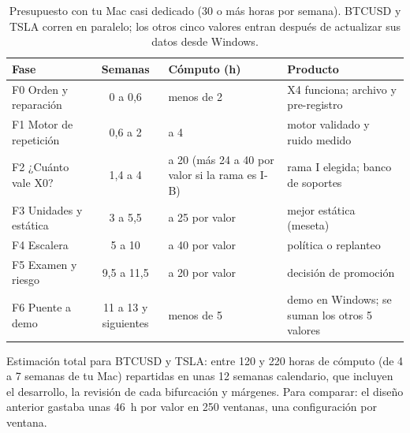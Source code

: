\documentclass[11pt,a4paper]{article}
\begin{document}
\begin{table}[H]
\centering\small
\begin{tabularx}{\linewidth}{lc>{\raggedright\arraybackslash}p{3.9cm}X}
\toprule
Fase & Semanas & Cómputo (h) & Producto \\
\midrule
F0 Orden y reparación & 0 a 0,6 & menos de 2 & X4 funciona; archivo y pre-registro \\
F1 Motor de repetición & 0,6 a 2 & 2 a 4 & motor validado y ruido medido \\
F2 ¿Cuánto vale X0? & 1,4 a 4 & 10 a 20 (más 24 a 40 por valor si la rama es I-B) & rama I elegida; banco de soportes \\
F3 Unidades y estática & 3 a 5,5 & 15 a 25 por valor & mejor estática (meseta) \\
F4 Escalera & 5 a 10 & 10 a 40 por valor & política o replanteo \\
F5 Examen y riesgo & 9,5 a 11,5 & 10 a 20 por valor & decisión de promoción \\
F6 Puente a demo & 11 a 13 y siguientes & menos de 5 & demo en Windows; se suman los otros 5 valores \\
\bottomrule
\end{tabularx}
\caption{Presupuesto con tu Mac casi dedicado (30 o más horas por semana). BTCUSD y TSLA corren en paralelo; los otros cinco valores
entran después de actualizar sus datos desde Windows.}
\end{table}

Estimación total para BTCUSD y TSLA: entre 120 y 220 horas de cómputo (de 4 a 7 semanas de tu Mac) repartidas en unas 12 semanas
calendario, que incluyen el desarrollo, la revisión de cada bifurcación y márgenes. Para comparar: el diseño anterior gastaba
unas 46~h por valor en 250 ventanas, una configuración por ventana.
\end{document}
